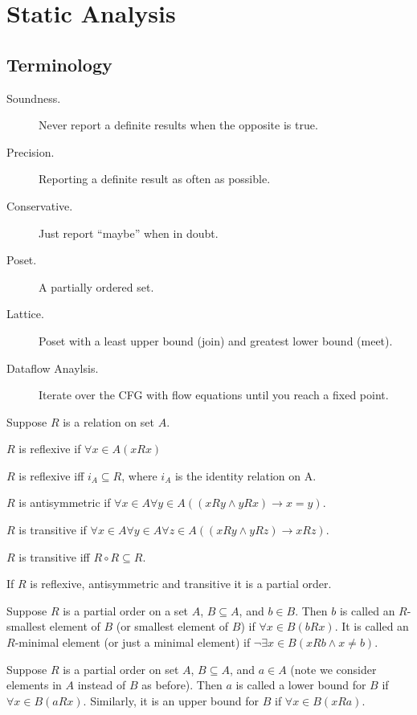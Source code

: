 \chapter{Static Analysis}

\section{Terminology}

\begin{description}
  \item[Soundness.] Never report a definite results when the opposite is true.
  \item[Precision.] Reporting a definite result as often as possible.
  \item[Conservative.] Just report ``maybe'' when in doubt.
  \item[Poset.] A partially ordered set.
  \item[Lattice.] Poset with a least upper bound (join) and greatest lower bound
                  (meet).
  \item[Dataflow Anaylsis.] Iterate over the CFG with flow equations until you
                            reach a fixed point.
\end{description}

Suppose $R$ is a relation on set $A$.

$R$ is reflexive if $\forall x \in A (x R x)$

$R$ is reflexive iff $i_A \subseteq R$, where $i_A$ is the identity  relation
on A.

$R$ is antisymmetric if $\forall x \in A \forall y \in A ((x R y \land y R x)
\rightarrow x = y)$.

$R$ is transitive if $\forall x \in A \forall y \in A \forall z \in A
((x R y \land y R z) \rightarrow x R z)$.

$R$ is transitive iff $R \circ R \subseteq R$.

If $R$ is reflexive, antisymmetric and transitive it is a partial order.

Suppose $R$ is a partial order on a set $A$, $B \subseteq A$, and $b \in B$.
Then $b$ is called an $R$-smallest element of $B$ (or smallest element of $B$)
if $\forall x \in B (b R x)$. It is called  an $R$-minimal element (or just a
minimal element) if $\lnot \exists x \in B (x R b \land x \neq b)$.

Suppose $R$ is a partial order on set $A$, $B \subseteq A$, and $a \in A$ (note
we consider elements in $A$ instead of $B$ as before). Then $a$ is called a
lower bound for $B$ if $\forall x \in B (a R x)$. Similarly, it is an upper
bound for $B$ if $\forall x \in B (x R a)$.

